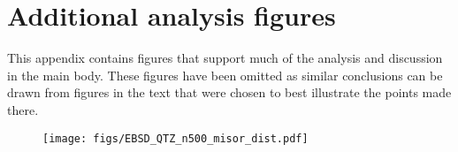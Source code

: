 \documentclass[a4paper,12pt]{report}
\numberwithin{equation}{chapter}
\begin{document}
\newpage
\section{Additional analysis figures}
This appendix contains figures that support much of the analysis and discussion in the main body. These figures have been omitted as similar conclusions can be drawn from figures in the text that were chosen to best illustrate the points made there. 

\begin{figure}[h]
  \centering
    \texttt{[image: figs/EBSD\_QTZ\_n500\_misor\_dist.pdf]}
  \caption[Misorientation angle distribution (quartz EBSD)]{} 
  \label{fig:APP_misor_dist_qtz_ebsd}
\end{figure} 
\end{document}

